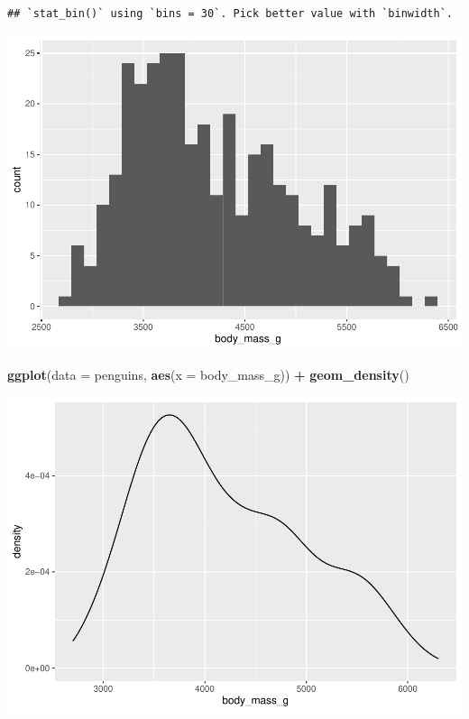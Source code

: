 \documentclass[
]{book}
\newenvironment{Shaded}{\begin{snugshade}}{\end{snugshade}}
\newcommand{\AttributeTok}[1]{\textcolor[rgb]{0.13,0.29,0.53}{#1}}
\newcommand{\FunctionTok}[1]{\textcolor[rgb]{0.13,0.29,0.53}{\textbf{#1}}}
\newcommand{\NormalTok}[1]{#1}
\newcommand{\SpecialCharTok}[1]{\textcolor[rgb]{0.81,0.36,0.00}{\textbf{#1}}}
\begin{document}
\begin{verbatim}
## `stat_bin()` using `bins = 30`. Pick better value with `binwidth`.
\end{verbatim}

\includegraphics{_main_files/figure-latex/unnamed-chunk-57-1.pdf}

\begin{Shaded}
\begin{Highlighting}[]
\FunctionTok{ggplot}\NormalTok{(}\AttributeTok{data =}\NormalTok{ penguins, }\FunctionTok{aes}\NormalTok{(}\AttributeTok{x =}\NormalTok{ body\_mass\_g)) }\SpecialCharTok{+} 
  \FunctionTok{geom\_density}\NormalTok{()}
\end{Highlighting}
\end{Shaded}

\includegraphics{_main_files/figure-latex/unnamed-chunk-57-2.pdf}
\end{document}
